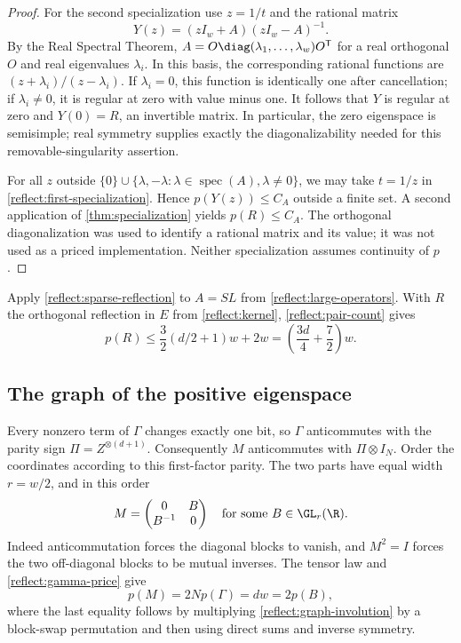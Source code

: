 \begin{proof}
For the second specialization use $z=1/t$ and the rational matrix
\[
 Y(z)=(zI_w+A)(zI_w-A)^{-1}.
\]
By the Real Spectral Theorem, $A=O\diag(\lambda_1,\ldots,\lambda_w)
O^{\mathsf T}$ for a real orthogonal $O$ and real eigenvalues
$\lambda_i$.  In this basis, the corresponding rational functions
are $(z+\lambda_i)/(z-\lambda_i)$.
If $\lambda_i=0$, this function is identically one after cancellation;
if $\lambda_i\ne0$, it is regular at zero with value minus one.
It follows that $Y$ is regular at zero and $Y(0)=R$, an invertible
matrix.  In particular, the zero eigenspace is semisimple; real
symmetry supplies exactly the diagonalizability needed for this
removable-singularity assertion.

For all $z$ outside
$\{0\}\cup\{\lambda,-\lambda:\lambda\in\operatorname{spec}(A),
\lambda\ne0\}$, we may take $t=1/z$ in
\eqref{reflect:first-specialization}.  Hence $p(Y(z))\leq C_A$
outside a finite set.  A second application of
\cref{thm:specialization} yields $p(R)\leq C_A$.
The orthogonal diagonalization was used to identify a rational
matrix and its value; it was not used as a priced implementation.
Neither specialization assumes continuity of $p$.
\end{proof}

Apply \cref{reflect:sparse-reflection} to $A=SL$ from
\eqref{reflect:large-operators}.  With $R$ the orthogonal reflection
in $E$ from \eqref{reflect:kernel}, \eqref{reflect:pair-count} gives
\begin{equation}
 p(R)\leq \frac32(d/2+1)w+2w
        =\left(\frac{3d}{4}+\frac72\right)w.
 \label{reflect:upper-bound}
\end{equation}

\subsection{The graph of the positive eigenspace}

Every nonzero term of $\Gamma$ changes exactly one bit, so $\Gamma$
anticommutes with the parity sign $\Pi=Z^{\otimes(d+1)}$.
Consequently $M$ anticommutes with $\Pi\otimes I_N$.
Order the coordinates according to this first-factor parity.
The two parts have equal width $r=w/2$, and in this order
\begin{equation}
 M=\begin{pmatrix}0&B\\B^{-1}&0\end{pmatrix}
 \quad\hbox{for some }B\in\GL_r(\R).
 \label{reflect:graph-involution}
\end{equation}
Indeed anticommutation forces the diagonal blocks to vanish, and
$M^2=I$ forces the two off-diagonal blocks to be mutual inverses.
The tensor law and \eqref{reflect:gamma-price} give
\begin{equation}
 p(M)=2N p(\Gamma)=dw=2p(B),
 \label{reflect:m-price}
\end{equation}
where the last equality follows by multiplying
\eqref{reflect:graph-involution} by a block-swap permutation and
then using direct sums and inverse symmetry.

